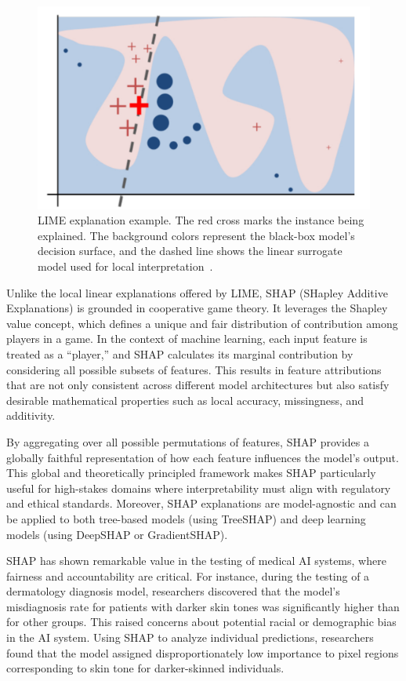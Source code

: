 \documentclass[manuscript,screen,review]{acmart}
\begin{document}
\begin{figure}[htbp]
  \centering
  \includegraphics[width=0.6\linewidth]{picture/5.2fig1.pdf}
  \caption{LIME explanation example. The red cross marks the instance being explained. The background colors represent the black-box model’s decision surface, and the dashed line shows the linear surrogate model used for local interpretation~\cite{Ribeiro2016}.}
  \label{fig:lime}
\end{figure}

Unlike the local linear explanations offered by LIME, SHAP (SHapley Additive Explanations) is grounded in cooperative game theory. It leverages the Shapley value concept, which defines a unique and fair distribution of contribution among players in a game. In the context of machine learning, each input feature is treated as a ``player,'' and SHAP calculates its marginal contribution by considering all possible subsets of features. This results in feature attributions that are not only consistent across different model architectures but also satisfy desirable mathematical properties such as local accuracy, missingness, and additivity.

By aggregating over all possible permutations of features, SHAP provides a globally faithful representation of how each feature influences the model’s output. This global and theoretically principled framework makes SHAP particularly useful for high-stakes domains where interpretability must align with regulatory and ethical standards. Moreover, SHAP explanations are model-agnostic and can be applied to both tree-based models (using TreeSHAP) and deep learning models (using DeepSHAP or GradientSHAP).

SHAP has shown remarkable value in the testing of medical AI systems, where fairness and accountability are critical. For instance, during the testing of a dermatology diagnosis model, researchers discovered that the model’s misdiagnosis rate for patients with darker skin tones was significantly higher than for other groups. This raised concerns about potential racial or demographic bias in the AI system. Using SHAP to analyze individual predictions, researchers found that the model assigned disproportionately low importance to pixel regions corresponding to skin tone for darker-skinned individuals.
\end{document}
